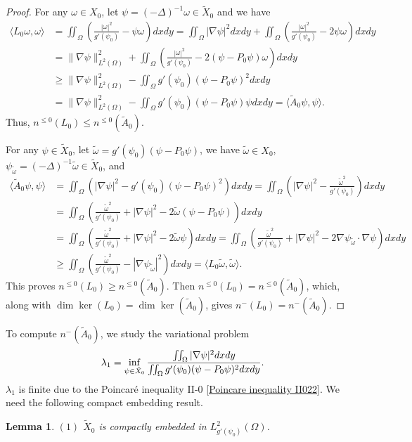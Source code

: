 \documentclass[1 [leqno, 11pt]{amsart}
\numberwithin{equation}{section}
\newtheorem{lemma}[Theorem]{Lemma}
\begin{document}
\begin{CJK*}{GBK}{song}
\begin{proof}
For any $\omega \in X_0$, let $\psi = (-\Delta)^{-1} \omega\in \tilde X_0$ and we have
\begin{align}\nonumber
\langle L_0 \omega, \omega\rangle
& = \iint_\Omega \left(\frac{|\omega|^2}{g'(\psi_0)} -   \psi\omega\right) dxdy  = \iint_\Omega |\nabla \psi|^2 dxdy + \iint_\Omega \left(\frac{|\omega|^2}{g'(\psi_0)} -  2 \psi\omega\right) dxdy \\\nonumber
& =\|\nabla \psi\|_{L^2(\Omega)}^2 +\iint_\Omega\left( \frac{|\omega|^2}{g'(\psi_0)} -  2 (\psi-P_0\psi)\omega \right)dxdy\\\nonumber
& \geq\|\nabla \psi\|_{L^2(\Omega)}^2 - \iint_\Omega g'(\psi_0)(\psi - P_0\psi)^2 dxdy \\\label{L0omega-omega}
& = \|\nabla \psi\|_{L^2(\Omega)}^2 - \iint_\Omega g'(\psi_0)(\psi - P_0\psi)\psi dxdy  = \langle\tilde{A}_0 \psi, \psi\rangle.
\end{align}
Thus, $n^{\leq 0} (L_0) \leq n^{\leq 0} (\tilde{A}_0)$.

For any $\psi \in \tilde{X}_0$, let $\tilde{\omega} = g'(\psi_0)(\psi - P_0\psi)$, we have
$\tilde{\omega} \in X_0$, $\psi_{\tilde{\omega}} = (-\Delta)^{-1}\tilde{\omega}\in \tilde X_0$, and
\begin{align*}
\langle\tilde{A}_0 \psi, \psi\rangle
& = \iint_\Omega\left( |\nabla \psi|^2  - g'(\psi_0)(\psi - P_0\psi)^2 \right)dxdy
 = \iint_\Omega \left(|\nabla \psi|^2  - \frac{\tilde{\omega}^2}{g'(\psi_0)}\right)dxdy \\
& = \iint_\Omega \left(\frac{\tilde{\omega}^2}{g'(\psi_0)} + |\nabla \psi|^2  - 2  \tilde{\omega}(\psi - P_0\psi)\right)dxdy\\
&= \iint_\Omega \left(\frac{\tilde{\omega}^2}{g'(\psi_0)} + |\nabla \psi|^2  - 2  \tilde{\omega}\psi\right)dxdy
 = \iint_\Omega \left(\frac{\tilde{\omega}^2}{g'(\psi_0)} +  |\nabla \psi|^2 - 2  \nabla\psi_{\tilde\omega}\cdot\nabla\psi \right)dxdy \\
  &\geq \iint_\Omega \left(\frac{\tilde{\omega}^2}{g'(\psi_0)} -  |\nabla \psi_{\tilde \omega}|^2\right) dxdy= \langle L_0 \tilde{\omega}, \tilde{\omega}\rangle.
\end{align*}
This proves $n^{\leq 0} (L_0) \geq n^{\leq 0} (\tilde{A}_0)$. Then $n^{\leq 0} (L_0) =n^{\leq 0} (\tilde{A}_0)$, which, along with
$\dim\ker(L_0) = \dim\ker(\tilde{A}_0)$, gives $n^{-} (L_0) =n^{-} (\tilde{A}_0)$.
\end{proof}

To compute $n^{-}(\tilde{A}_0)$, we study the variational problem
\begin{align}\label{variational problem1}
\lambda_1= \inf_{\psi\in\tilde X_0}{\iint_\Omega|\nabla\psi|^2dxdy\over\iint_\Omega g'(\psi_0)(\psi - P_0\psi)^2dxdy}.
\end{align}
$\lambda_1$ is finite due to the Poincar\'e inequality II-$0$ \eqref{Poincare inequality II022}.
We
need the following compact embedding result.
\begin{lemma}\label{compact2P}
$(1)$ $\tilde X_0$ is compactly embedded in $L_{g'(\psi_0)}^2(\Omega)$.


\end{lemma}
\end{CJK*}
\end{document}
